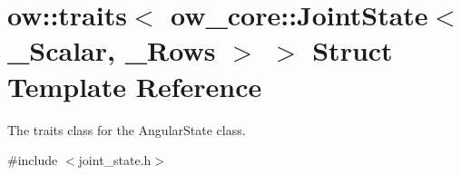 \hypertarget{structow_1_1traits_3_01ow__core_1_1JointState_3_01__Scalar_00_01__Rows_01_4_01_4}{}\section{ow\+:\+:traits$<$ ow\+\_\+core\+:\+:Joint\+State$<$ \+\_\+\+Scalar, \+\_\+\+Rows $>$ $>$ Struct Template Reference}
\label{structow_1_1traits_3_01ow__core_1_1JointState_3_01__Scalar_00_01__Rows_01_4_01_4}


The traits class for the Angular\+State class.  




{\ttfamily \#include $<$joint\+\_\+state.\+h$>$}

